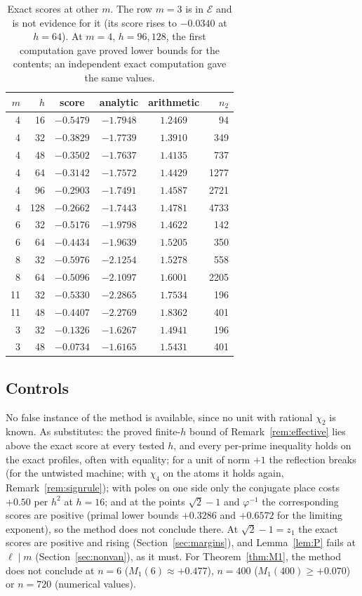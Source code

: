 \documentclass[11pt]{amsart}
\theoremstyle{definition}
\theoremstyle{remark}
\numberwithin{equation}{section}
\newcommand{\cE}{\mathcal{E}}
\begin{document}
\begin{table}[ht]
\centering\small
\begin{tabular}{@{}rrcccr@{}}
\toprule
$m$ & $h$ & score & analytic & arithmetic & $n_2$\\
\midrule
4 & 16 & $-0.5479$ & $-1.7948$ & $1.2469$ & 94\\
4 & 32 & $-0.3829$ & $-1.7739$ & $1.3910$ & 349\\
4 & 48 & $-0.3502$ & $-1.7637$ & $1.4135$ & 737\\
4 & 64 & $-0.3142$ & $-1.7572$ & $1.4429$ & 1277\\
4 & 96 & $-0.2903$ & $-1.7491$ & $1.4587$ & 2721\\
4 & 128 & $-0.2662$ & $-1.7443$ & $1.4781$ & 4733\\
6 & 32 & $-0.5176$ & $-1.9798$ & $1.4622$ & 142\\
6 & 64 & $-0.4434$ & $-1.9639$ & $1.5205$ & 350\\
8 & 32 & $-0.5976$ & $-2.1254$ & $1.5278$ & 558\\
8 & 64 & $-0.5096$ & $-2.1097$ & $1.6001$ & 2205\\
11 & 32 & $-0.5330$ & $-2.2865$ & $1.7534$ & 196\\
11 & 48 & $-0.4407$ & $-2.2769$ & $1.8362$ & 401\\
\midrule
3 & 32 & $-0.1326$ & $-1.6267$ & $1.4941$ & 196\\
3 & 48 & $-0.0734$ & $-1.6165$ & $1.5431$ & 401\\
\bottomrule
\end{tabular}
\caption{Exact scores at other $m$. The row $m=3$ is in $\cE$ and is not evidence for it (its score rises to $-0.0340$ at
$h=64$). At $m=4$, $h=96,128$, the first computation gave proved lower bounds for the contents; an independent exact
computation gave the same values.}\label{tab:evidenceV}
\end{table}

\subsection{Controls}
No false instance of the method is available, since no unit with rational $\chi_2$ is known. As substitutes: the proved
finite-$h$ bound of Remark~\ref{rem:effective} lies above the exact score at every tested $h$, and every per-prime
inequality holds on the exact profiles, often with equality; for a unit of norm $+1$ the reflection breaks (for the untwisted machine; with $\chi_4$ on the
atoms it holds again, Remark~\ref{rem:signrule}); with poles
on one side only the conjugate place costs $+0.50$ per $h^2$ at $h=16$; and at the points $\sqrt2-1$ and $\varphi^{-1}$ the
corresponding scores are positive (primal lower bounds $+0.3286$ and $+0.6572$ for the limiting exponent), so the
method does not conclude there. At $\sqrt2-1=z_1$ the exact scores are positive and rising (Section~\ref{sec:margins}),
and Lemma~\ref{lem:P} fails at $\ell\mid m$ (Section~\ref{sec:nonvan}), as it must. For Theorem~\ref{thm:M1}, the
method does not conclude at $n=6$ ($M_1(6)\approx+0.477$), $n=400$ ($M_1(400)\ge+0.070$) or $n=720$ (numerical values).
\end{document}

